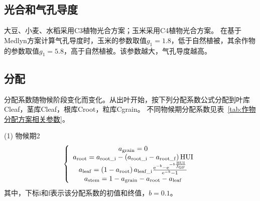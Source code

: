 \subsection{光合和气孔导度}
大豆、小麦、水稻采用C3植物光合方案；玉米采用C4植物光合方案。
在基于Medlyn方案计算气孔导度时，玉米的参数取值$g_1=1.8$，低于自然植被，其余作物的参数取值$g_1=5.8$，高于自然植被。该参数越大，气孔导度越高。

\subsection{分配}
分配系数随物候阶段变化而变化。从出叶开始，按下列分配系数公式分配到叶库Cleaf，茎库Cleaf，根库Croot，粒库Cgrain。
不同物候期分配系数见表~\ref{tab:作物分配方案相关参数}。

(1)	物候期2 \\
\begin{equation}
  \left\{\begin{array}{c}
      a_{\mathrm{grain}}=0 \\
      a_{\mathrm{root}}=a_{\mathrm{root\_i}}-\left(a_{\mathrm{root\_i}}-a_{\mathrm{root\_f}}\right) {\mathrm {HUI}} \\
      a_{\mathrm{leaf}}=\left(1-a_{\mathrm{root}}\right) a_{\mathrm{leaf\_i}} \frac{{\rm e}^{-{b}}-{\rm e}^{-b \frac{{\mathrm {HUI}}}{f_{\mathrm{GF}}}}}{{\rm e}^{-{b}}-1}   \\
      a_{\mathrm{stem}}=1-a_{\mathrm{grain}}-a_{\mathrm{root}}-a_{\mathrm{leaf}}
  \end{array}\right.
\end{equation}
其中，下标i和f表示该分配系数的初值和终值，$b=0.1$。

